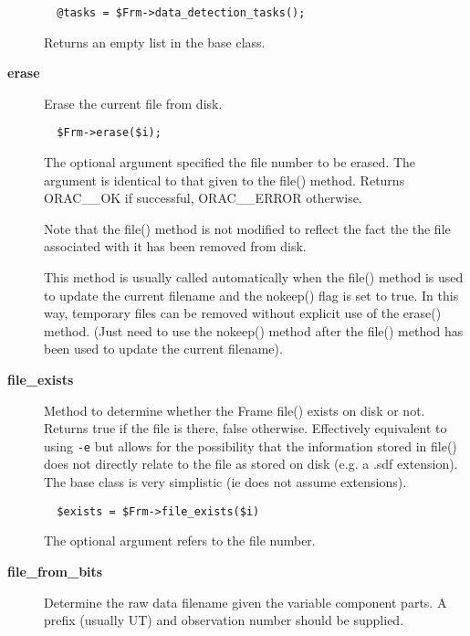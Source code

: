 \begin{description}
\begin{verbatim}
  @tasks = $Frm->data_detection_tasks();
\end{verbatim}


Returns an empty list in the base class.


\item[\textbf{erase}] \mbox{}

Erase the current file from disk.

\begin{verbatim}
  $Frm->erase($i);
\end{verbatim}


The optional argument specified the file number to be erased.
The argument is identical to that given to the file() method.
Returns ORAC\_\_OK if successful, ORAC\_\_ERROR otherwise.



Note that the file() method is not modified to reflect the
fact the the file associated with it has been removed from disk.



This method is usually called automatically when the file()
method is used to update the current filename and the nokeep()
flag is set to true. In this way, temporary files can be removed
without explicit use of the erase() method. (Just need to
use the nokeep() method after the file() method has been used
to update the current filename).


\item[\textbf{file\_exists}] \mbox{}

Method to determine whether the Frame file() exists on disk or not.
Returns true if the file is there, false otherwise. Effectively
equivalent to using \texttt{-e} but allows for the possibility that the
information stored in file() does not directly relate to the
file as stored on disk (e.g. a .sdf extension). The base class is
very simplistic (ie does not assume extensions).

\begin{verbatim}
  $exists = $Frm->file_exists($i)
\end{verbatim}


The optional argument refers to the file number.


\item[\textbf{file\_from\_bits}] \mbox{}

Determine the raw data filename given the variable component
parts. A prefix (usually UT) and observation number should
be supplied.


\end{description}
